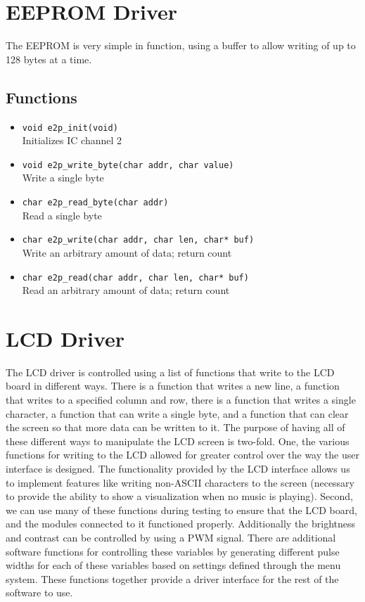 \section{EEPROM Driver}
The EEPROM is very simple in function, using a buffer to allow writing of up to 128 bytes at a time.
\subsection*{Functions}
\begin{itemize}
\item \texttt{void e2p\_init(void)} \\ Initializes IC channel 2
\item \texttt{void e2p\_write\_byte(char addr, char value)} \\ Write a single byte
\item \texttt{char e2p\_read\_byte(char addr)} \\ Read a single byte
\item \texttt{char e2p\_write(char addr, char len, char* buf)} \\ Write an arbitrary amount of data; return count
\item \texttt{char e2p\_read(char addr, char len, char* buf)} \\ Read an arbitrary amount of data; return count
\end{itemize}

\section{LCD Driver}

The LCD driver is controlled using a list of functions that write to the LCD board in different ways. There is a function that writes a new line, a function that writes to a specified column and row, there is a function that writes a single character, a function that can write a single byte, and a function that can clear the screen so that more data can be written to it. The purpose of having all of these different ways to manipulate the LCD screen is two-fold. One, the various functions for writing to the LCD allowed for greater control over the way the user interface is designed. The functionality provided by the LCD interface allows us to implement features like writing non-ASCII characters to the screen (necessary to provide the ability to show a visualization when no music is playing). Second, we can use many of these functions during testing to ensure that the LCD board, and the modules connected to it functioned properly. Additionally the brightness and contrast can be controlled by using a PWM signal. There are additional software functions for controlling these variables by generating different pulse widths for each of these variables based on settings defined through the menu system. These functions together provide a driver interface for the rest of the software to use.

